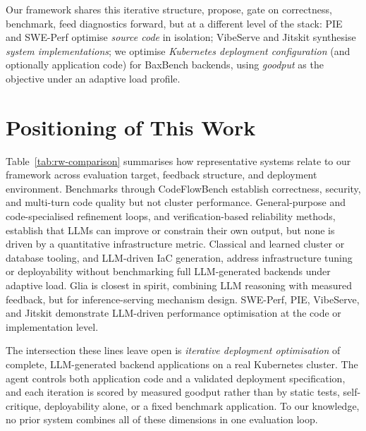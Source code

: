 Our framework shares this iterative structure, propose, gate on correctness,
benchmark, feed diagnostics forward, but at a different level of the stack:
PIE and SWE-Perf optimise \emph{source code} in isolation; VibeServe and
Jitskit synthesise \emph{system implementations}; we optimise
\emph{Kubernetes deployment configuration} (and optionally application code)
for BaxBench backends, using \emph{goodput} as the objective under an
adaptive load profile.


\section{Positioning of This Work}
\label{sec:rw-positioning}

Table~\ref{tab:rw-comparison} summarises how representative systems relate to
our framework across evaluation target, feedback structure, and deployment
environment.  Benchmarks through CodeFlowBench establish correctness,
security, and multi-turn code quality but not cluster performance.
General-purpose and code-specialised refinement loops, and verification-based
reliability methods, establish that LLMs can improve or constrain their own
output, but none is driven by a quantitative infrastructure metric.
Classical and learned cluster or database tooling, and LLM-driven IaC
generation, address infrastructure tuning or deployability without
benchmarking full LLM-generated backends under adaptive load.  Glia is
closest in spirit, combining LLM reasoning with measured feedback, but for
inference-serving mechanism design.  SWE-Perf, PIE, VibeServe, and Jitskit
demonstrate LLM-driven performance optimisation at the code or
implementation level.

The intersection these lines leave open is \emph{iterative deployment
optimisation} of complete, LLM-generated backend applications on a real
Kubernetes cluster. The agent controls both application code and a validated
deployment specification, and each iteration is scored by measured goodput
rather than by static tests, self-critique, deployability alone, or a fixed
benchmark application. To our knowledge, no prior system combines all of
these dimensions in one evaluation loop.


